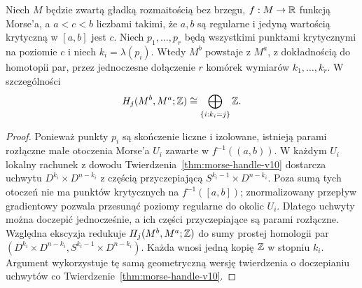 \begin{lemat}
\label{lem:morse-same-level-audit}
Niech $M$ będzie zwartą gładką rozmaitością bez brzegu,
$f:M\to\mathbb{R}$ funkcją Morse'a, a $a<c<b$ liczbami takimi, że
$a,b$ są regularne i jedyną wartością krytyczną w $[a,b]$ jest $c$.
Niech $p_1,\dots,p_r$ będą wszystkimi punktami krytycznymi na
poziomie $c$ i niech $k_i=\lambda(p_i)$. Wtedy $M^b$ powstaje z $M^a$,
z dokładnością do homotopii par, przez jednoczesne dołączenie
$r$ komórek wymiarów $k_1,\dots,k_r$. W szczególności
\[
 H_j(M^b,M^a;\mathbb{Z})\cong
 \bigoplus_{\{i:k_i=j\}}\mathbb{Z}.
\]
\end{lemat}
\begin{proof}
Ponieważ punkty $p_i$ są skończenie liczne i izolowane, istnieją
parami rozłączne małe otoczenia Morse'a $U_i$ zawarte w
$f^{-1}((a,b))$. W każdym $U_i$ lokalny rachunek z dowodu
Twierdzenia~\ref{thm:morse-handle-v10} dostarcza uchwytu
$D^{k_i}\times D^{n-k_i}$ z częścią przyczepiającą
$S^{k_i-1}\times D^{n-k_i}$. Poza sumą tych otoczeń
nie ma punktów krytycznych na $f^{-1}([a,b])$;
znormalizowany przepływ gradientowy pozwala przesunąć
poziomy regularne do okolic $U_i$. Dlatego uchwyty można
doczepić jednocześnie, a ich części przyczepiające są
parami rozłączne. Względna ekscyzja redukuje
$H_j(M^b,M^a;\mathbb{Z})$ do sumy prostej homologii par
$(D^{k_i}\times D^{n-k_i},S^{k_i-1}\times D^{n-k_i})$.
Każda wnosi jedną kopię $\mathbb{Z}$ w stopniu $k_i$.
Argument wykorzystuje tę samą geometryczną wersję twierdzenia
o doczepianiu uchwytów co Twierdzenie~\ref{thm:morse-handle-v10}.
\end{proof}

